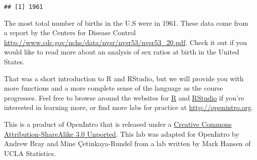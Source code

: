 \documentclass[]{article}
\newenvironment{Shaded}{\begin{snugshade}}{\end{snugshade}}
\newcommand{\KeywordTok}[1]{\textcolor[rgb]{0.13,0.29,0.53}{\textbf{#1}}}
\newcommand{\StringTok}[1]{\textcolor[rgb]{0.31,0.60,0.02}{#1}}
\newcommand{\OperatorTok}[1]{\textcolor[rgb]{0.81,0.36,0.00}{\textbf{#1}}}
\newcommand{\NormalTok}[1]{#1}
\begin{document}
\begin{Shaded}
\end{Shaded}

\begin{verbatim}
## [1] 1961
\end{verbatim}

The most total number of births in the U.S were in 1961. These data come
from a report by the Centers for Disease Control
\url{http://www.cdc.gov/nchs/data/nvsr/nvsr53/nvsr53_20.pdf}. Check it
out if you would like to read more about an analysis of sex ratios at
birth in the United States.

That was a short introduction to R and RStudio, but we will provide you
with more functions and a more complete sense of the language as the
course progresses. Feel free to browse around the websites for
\href{http://www.r-project.org}{R} and
\href{http://rstudio.org}{RStudio} if you're interested in learning
more, or find more labs for practice at \url{http://openintro.org}.

\hypertarget{license}{}
This is a product of OpenIntro that is released under a
\href{http://creativecommons.org/licenses/by-sa/3.0}{Creative Commons
Attribution-ShareAlike 3.0 Unported}. This lab was adapted for OpenIntro
by Andrew Bray and Mine Çetinkaya-Rundel from a lab written by Mark
Hansen of UCLA Statistics.
\end{document}
